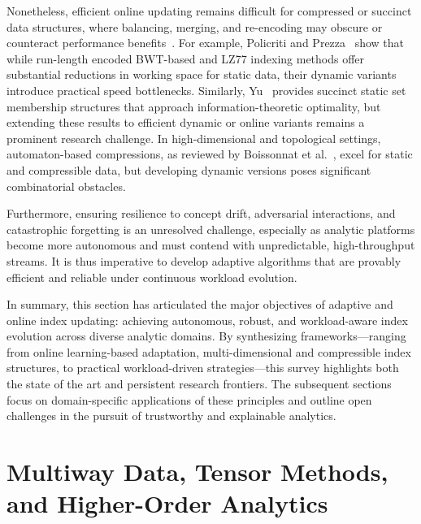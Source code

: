\documentclass[sigconf]{acmart}
\begin{document}
Nonetheless, efficient online updating remains difficult for compressed or succinct data structures, where balancing, merging, and re-encoding may obscure or counteract performance benefits~\cite{ref80,ref81,ref82,ref108,ref109}. For example, Policriti and Prezza~\cite{ref80} show that while run-length encoded BWT-based and LZ77 indexing methods offer substantial reductions in working space for static data, their dynamic variants introduce practical speed bottlenecks. Similarly, Yu~\cite{ref82} provides succinct static set membership structures that approach information-theoretic optimality, but extending these results to efficient dynamic or online variants remains a prominent research challenge. In high-dimensional and topological settings, automaton-based compressions, as reviewed by Boissonnat et al.~\cite{ref79}, excel for static and compressible data, but developing dynamic versions poses significant combinatorial obstacles.

Furthermore, ensuring resilience to concept drift, adversarial interactions, and catastrophic forgetting is an unresolved challenge, especially as analytic platforms become more autonomous and must contend with unpredictable, high-throughput streams. It is thus imperative to develop adaptive algorithms that are provably efficient and reliable under continuous workload evolution.

\bigskip

In summary, this section has articulated the major objectives of adaptive and online index updating: achieving autonomous, robust, and workload-aware index evolution across diverse analytic domains. By synthesizing frameworks—ranging from online learning-based adaptation, multi-dimensional and compressible index structures, to practical workload-driven strategies—this survey highlights both the state of the art and persistent research frontiers. The subsequent sections focus on domain-specific applications of these principles and outline open challenges in the pursuit of trustworthy and explainable analytics.

\section{Multiway Data, Tensor Methods, and Higher-Order Analytics}
\end{document}
